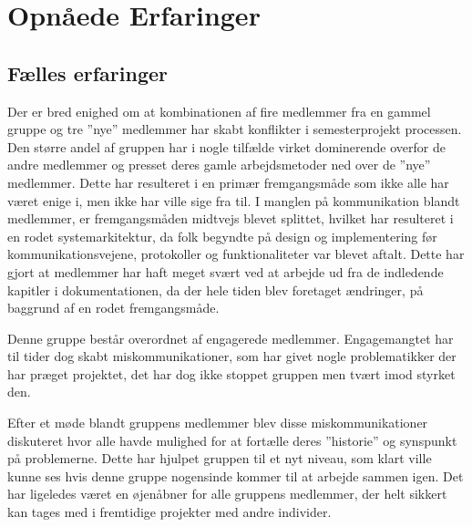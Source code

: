\chapter{Opnåede Erfaringer}
\section{Fælles erfaringer}
Der er bred enighed om at kombinationen af fire medlemmer fra en gammel gruppe og tre ''nye'' medlemmer har skabt konflikter i semesterprojekt processen. Den større andel af gruppen har i nogle tilfælde virket dominerende overfor de andre medlemmer og presset deres gamle arbejdsmetoder ned over de ''nye'' medlemmer. Dette har resulteret i en primær fremgangsmåde som ikke alle har været enige i, men ikke har ville sige fra til. I manglen på kommunikation blandt medlemmer, er fremgangsmåden midtvejs blevet splittet, hvilket har resulteret i en rodet systemarkitektur, da folk begyndte på design og implementering før kommunikationsvejene, protokoller og funktionaliteter var blevet aftalt. Dette har gjort at medlemmer har haft meget svært ved at arbejde ud fra de indledende kapitler i dokumentationen, da der hele tiden blev foretaget ændringer, på baggrund af en rodet fremgangsmåde.

Denne gruppe består overordnet af engagerede medlemmer. Engagemangtet har til tider dog skabt miskommunikationer, som har givet nogle problematikker der har præget projektet, det har dog ikke stoppet gruppen men tvært imod styrket den.

Efter et møde blandt gruppens medlemmer blev disse miskommunikationer diskuteret hvor alle havde mulighed for at fortælle deres ''historie'' og synspunkt på problemerne. Dette har hjulpet gruppen til et nyt niveau, som klart ville kunne ses hvis denne gruppe nogensinde kommer til at arbejde sammen igen. Det har ligeledes været en øjenåbner for alle gruppens medlemmer, der helt sikkert kan tages med i fremtidige projekter med andre individer.









\clearpage